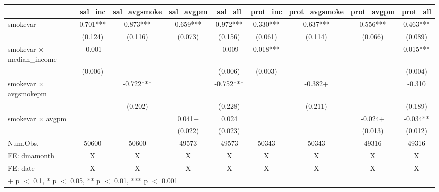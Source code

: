 \begin{table}
\centering
\begin{tabular}[t]{lcccccccc}
\toprule
  & sal\_inc & sal\_avgsmoke & sal\_avgpm & sal\_all & prot\_inc & prot\_avgsmoke & prot\_avgpm & prot\_all\\
\midrule
smokevar & 0.701*** & 0.873*** & 0.659*** & 0.972*** & 0.330*** & 0.637*** & 0.556*** & 0.463***\\
 & (0.124) & (0.116) & (0.073) & (0.156) & (0.061) & (0.114) & (0.066) & (0.089)\\
smokevar × median\_income & -0.001 &  &  & -0.009 & 0.018*** &  &  & 0.015***\\
 & (0.006) &  &  & (0.006) & (0.003) &  &  & (0.004)\\
smokevar × avgsmokepm &  & -0.722*** &  & -0.752*** &  & -0.382+ &  & -0.310\\
 &  & (0.202) &  & (0.228) &  & (0.211) &  & (0.189)\\
smokevar × avgpm &  &  & 0.041+ & 0.024 &  &  & -0.024+ & -0.034**\\
 &  &  & (0.022) & (0.023) &  &  & (0.013) & (0.012)\\
\midrule
Num.Obs. & 50600 & 50600 & 49573 & 49573 & 50343 & 50343 & 49316 & 49316\\
FE: dmamonth & X & X & X & X & X & X & X & X\\
FE: date & X & X & X & X & X & X & X & X\\
\bottomrule
\multicolumn{9}{l}{\rule{0pt}{1em}+ p $<$ 0.1, * p $<$ 0.05, ** p $<$ 0.01, *** p $<$ 0.001}\\
\end{tabular}
\end{table}
